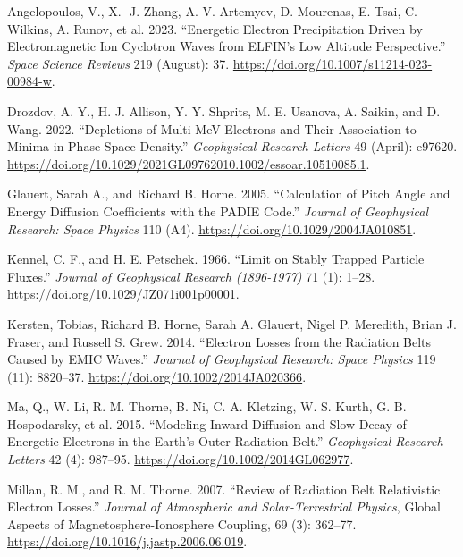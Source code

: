 \documentclass[
  letterpaper,
  DIV=11,
  numbers=noendperiod]{scrartcl}
\newlength{\cslhangindent}
\newenvironment{CSLReferences}[2] %
 {\begin{list}{}{%
  \setlength{\itemindent}{0pt}
  \setlength{\leftmargin}{0pt}
  \setlength{\parsep}{0pt}
  \ifodd #1
   \setlength{\leftmargin}{\cslhangindent}
   \setlength{\itemindent}{-1\cslhangindent}
  \fi
  \setlength{\itemsep}{#2\baselineskip}}}
 {\end{list}}
\begin{document}
\label{refs}
\begin{CSLReferences}{1}{0}
Angelopoulos, V., X. -J. Zhang, A. V. Artemyev, D. Mourenas, E. Tsai, C. Wilkins, A. Runov, et al. 2023. {``Energetic {Electron Precipitation Driven} by {Electromagnetic Ion Cyclotron Waves} from {ELFIN}'s {Low Altitude Perspective}.''} \emph{Space Science Reviews} 219 (August): 37. \url{https://doi.org/10.1007/s11214-023-00984-w}.

Drozdov, A. Y., H. J. Allison, Y. Y. Shprits, M. E. Usanova, A. Saikin, and D. Wang. 2022. {``Depletions of {Multi-MeV Electrons} and {Their Association} to {Minima} in {Phase Space Density}.''} \emph{Geophysical Research Letters} 49 (April): e97620. \url{https://doi.org/10.1029/2021GL09762010.1002/essoar.10510085.1}.

Glauert, Sarah A., and Richard B. Horne. 2005. {``Calculation of Pitch Angle and Energy Diffusion Coefficients with the {PADIE} Code.''} \emph{Journal of Geophysical Research: Space Physics} 110 (A4). \url{https://doi.org/10.1029/2004JA010851}.

Kennel, C. F., and H. E. Petschek. 1966. {``Limit on Stably Trapped Particle Fluxes.''} \emph{Journal of Geophysical Research (1896-1977)} 71 (1): 1--28. \url{https://doi.org/10.1029/JZ071i001p00001}.

Kersten, Tobias, Richard B. Horne, Sarah A. Glauert, Nigel P. Meredith, Brian J. Fraser, and Russell S. Grew. 2014. {``Electron Losses from the Radiation Belts Caused by {EMIC} Waves.''} \emph{Journal of Geophysical Research: Space Physics} 119 (11): 8820--37. \url{https://doi.org/10.1002/2014JA020366}.

Ma, Q., W. Li, R. M. Thorne, B. Ni, C. A. Kletzing, W. S. Kurth, G. B. Hospodarsky, et al. 2015. {``Modeling Inward Diffusion and Slow Decay of Energetic Electrons in the {Earth}'s Outer Radiation Belt.''} \emph{Geophysical Research Letters} 42 (4): 987--95. \url{https://doi.org/10.1002/2014GL062977}.

Millan, R. M., and R. M. Thorne. 2007. {``Review of Radiation Belt Relativistic Electron Losses.''} \emph{Journal of Atmospheric and Solar-Terrestrial Physics}, Global {Aspects} of {Magnetosphere-Ionosphere Coupling}, 69 (3): 362--77. \url{https://doi.org/10.1016/j.jastp.2006.06.019}.


\end{CSLReferences}
\end{document}
